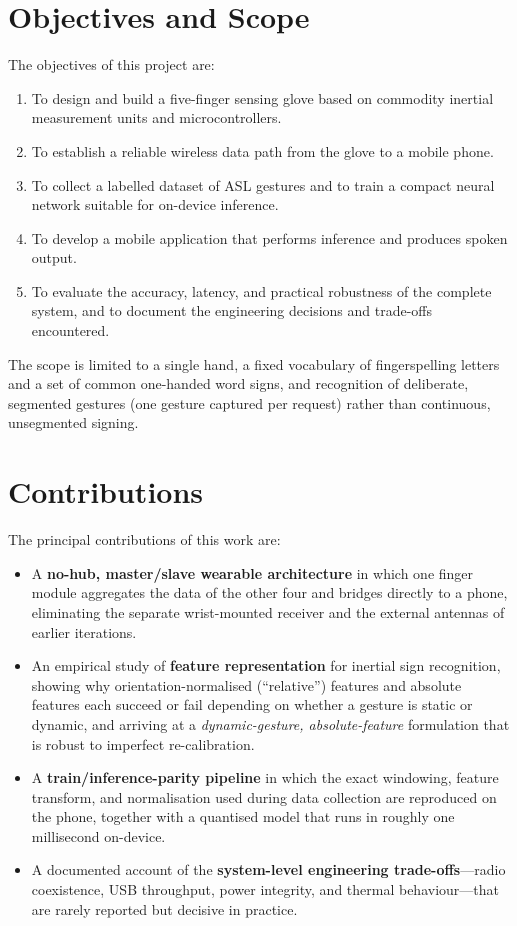 \section{Objectives and Scope}

The objectives of this project are:

\begin{enumerate}
    \item To design and build a five-finger sensing glove based on commodity
    inertial measurement units and microcontrollers.
    \item To establish a reliable wireless data path from the glove to a mobile
    phone.
    \item To collect a labelled dataset of ASL gestures and to train a compact
    neural network suitable for on-device inference.
    \item To develop a mobile application that performs inference and produces
    spoken output.
    \item To evaluate the accuracy, latency, and practical robustness of the
    complete system, and to document the engineering decisions and trade-offs
    encountered.
\end{enumerate}

The scope is limited to a single hand, a fixed vocabulary of fingerspelling
letters and a set of common one-handed word signs, and recognition of
deliberate, segmented gestures (one gesture captured per request) rather than
continuous, unsegmented signing.

\section{Contributions}

The principal contributions of this work are:

\begin{itemize}
    \item A \textbf{no-hub, master/slave wearable architecture} in which one
    finger module aggregates the data of the other four and bridges directly
    to a phone, eliminating the separate wrist-mounted receiver and the
    external antennas of earlier iterations.
    \item An empirical study of \textbf{feature representation} for
    inertial sign recognition, showing why orientation-normalised
    (``relative'') features and absolute features each succeed or fail
    depending on whether a gesture is static or dynamic, and arriving at a
    \emph{dynamic-gesture, absolute-feature} formulation that is robust to
    imperfect re-calibration.
    \item A \textbf{train/inference-parity pipeline} in which the exact
    windowing, feature transform, and normalisation used during data
    collection are reproduced on the phone, together with a quantised model
    that runs in roughly one millisecond on-device.
    \item A documented account of the \textbf{system-level engineering
    trade-offs}—radio coexistence, USB throughput, power integrity, and
    thermal behaviour—that are rarely reported but decisive in practice.
\end{itemize}


